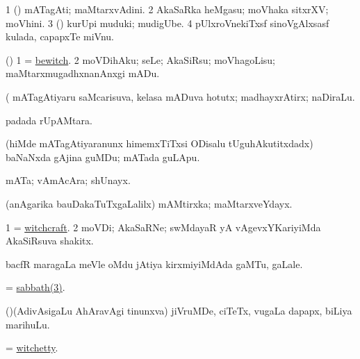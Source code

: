 \bentry
{} 
\gl{\nA}
\expl{}
\bmng
\bnum
\num{1} (\kanmu) mATagAti; maMtarxvAdini. 
\num{2} AkaSaRka heMgasu; moVhaka sitxrXV; moVhini. 
\num{3} (\rUpa) kurUpi muduki; mudigUbe. 
\num{4} pUlxroVnekiTxsf sinoVgAlxsasf kulada, capapxTe miVnu. 
\enum
\emng
\eentry

\bentry
{} 
\gl{\sakirx}
\bmng
(\pArxparx) 
\bnum
\num{1} = \hyperref{kandict_b.pdf}{B}{bewitch}{bewitch}. 
\num{2} moVDihAku; seLe; AkaSiRsu; moVhagoLisu; maMtarxmugadhxnanAnxgi mADu. 
\enum
\emng

\noindent
\gl{\pagu}
\expl{}
\bmng
{} (  mATagAtiyaru saMcarisuva, kelasa mADuva hotutx; madhayxrAtirx; naDiraLu. 
\emng
\eentry

\bentry
{} 
\gl{\sapUpa}
\expl{}
\bmng
{} padada rUpAMtara. 
\emng
\eentry

\bentry
{} 
\gl{\nA}
\expl{}
\bmng
(hiMde mATagAtiyaranunx himemxTiTxsi ODisalu tUguhAkutitxdadx) baNaNxda gAjina guMDu; mATada guLApu. 
\emng
\eentry

\bentry
{} 
\gl{\nA}
\expl{}
\bmng
mATa; vAmAcAra; shUnayx. 
\emng
\eentry

\bentry
{} 
\gl{\nA}
\expl{}
\bmng
(anAgarika bauDakaTuTxgaLalilx) mAMtirxka; maMtarxveYdayx. 
\emng
\eentry

\bentry
{} 
\gl{\nA}
\expl{}
\bmng
\bnum
\num{1} = \hyperlink{witchcraft}{witchcraft}. 
\num{2} moVDi; AkaSaRNe; swMdayaR yA vAgevxYKariyiMda AkaSiRsuva shakitx. 
\enum
\emng
\eentry

\bentry
{} 
\gl{\nA}
\expl{}
\bmng
bacfR maragaLa meVle oMdu jAtiya kirxmiyiMdAda gaMTu, gaLale. 
\emng
\eentry

\bentry
{} 
\gl{\nA}
\expl{}
\bmng
= \hyperref{kandict_s.pdf}{S}{sabbath(3)}{sabbath(3)}. 
\emng
\eentry

\bentry
{} 
\gl{\nA}
\bmng
(\AseTxrXV)(AdivAsigaLu AhAravAgi tinunxva) jiVruMDe, ciTeTx, \mo vugaLa dapapx, biLiya marihuLu. 
\emng
\eentry

\bentry
{} 
\gl{\nA}
\expl{}
\bmng
= \hyperlink{witchetty}{witchetty}. 
\emng
\eentry

